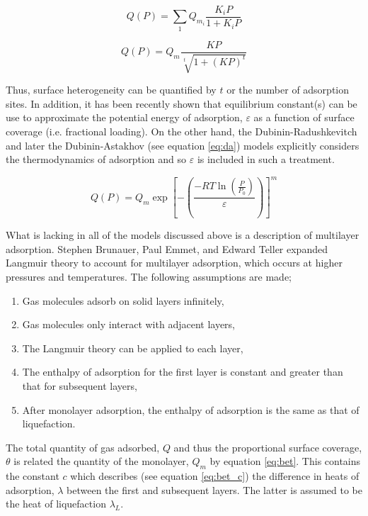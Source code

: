 \begin{equation}\label{eq:multi_langmuir}
    Q(P) = \sum_{1} Q_{m_i} \frac{K_i P}{1 + K_i P}
\end{equation}

\begin{equation}\label{eq:toth}
    Q(P) = Q_m \frac{K P}{\sqrt[t]{1 + (K P)^t}}
\end{equation}

Thus, surface heterogeneity can be quantified by $t$ or the number of adsorption sites. In addition, it has been recently shown that equilibrium constant(s) can be use to approximate the potential energy of adsorption, $\varepsilon$ as a function of surface coverage (i.e. fractional loading).\citep{whittaker2013predicting} On the other hand, the  Dubinin-Radushkevitch and later the Dubinin-Astakhov (see equation \ref{eq:da}) models explicitly considers the thermodynamics of adsorption and so $\varepsilon$ is included in such a treatment.

\begin{equation}\label{eq:da}
    Q(P) = Q_m \exp{ \left[ - \left( \frac{ -R T \ln{\left( \frac{P}{P_0}\right)}}{\varepsilon} \right) \right]^m }
\end{equation}

What is lacking in all of the models discussed above is a description of multilayer adsorption. Stephen Brunauer, Paul Emmet, and Edward Teller expanded Langmuir theory to account for multilayer \gls{adsorption}, which occurs at higher pressures and temperatures. The following assumptions are made;\citep{Brunauer1938Adsorption}

	\begin{enumerate}[label=(\arabic*)]
		\item Gas molecules adsorb on solid layers infinitely,
		\item Gas molecules only interact with adjacent layers,
		\item The Langmuir theory can be applied to each layer,
		\item The enthalpy of \gls{adsorption} for the first layer is constant and greater than that for subsequent layers,
		\item After monolayer \gls{adsorption}, the enthalpy of \gls{adsorption} is the same as that of liquefaction.
	\end{enumerate}

The total quantity of gas adsorbed, $Q$  and thus the proportional surface coverage, $\theta$ is related the quantity of the monolayer, $Q_m$ by equation \ref{eq:bet}. This contains the constant $c$ which describes (see equation \ref{eq:bet_c}) the difference in heats of adsorption, $\lambda$ between the first and subsequent layers. The latter is assumed to be the heat of liquefaction $\lambda_L$.

